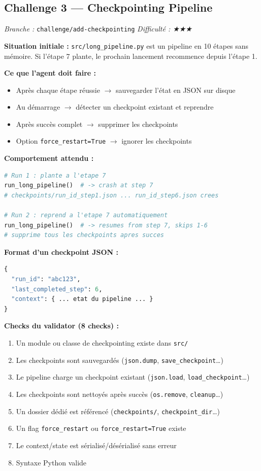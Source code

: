 \documentclass[11pt,a4paper]{article}
\newcommand{\code}[1]{\texttt{#1}}
\begin{document}
\subsection{Challenge 3 — Checkpointing Pipeline}
\textit{Branche :} \code{challenge/add-checkpointing} \quad \textit{Difficulté : ★★★}

\textbf{Situation initiale :}
\code{src/long\_pipeline.py} est un pipeline en 10 étapes sans mémoire.
Si l'étape 7 plante, le prochain lancement recommence depuis l'étape 1.

\textbf{Ce que l'agent doit faire :}
\begin{itemize}
  \item Après chaque étape réussie $\to$ sauvegarder l'état en JSON sur disque
  \item Au démarrage $\to$ détecter un checkpoint existant et reprendre
  \item Après succès complet $\to$ supprimer les checkpoints
  \item Option \code{force\_restart=True} $\to$ ignorer les checkpoints
\end{itemize}

\textbf{Comportement attendu :}
\begin{lstlisting}[language=Python]
# Run 1 : plante a l'etape 7
run_long_pipeline()  # -> crash at step 7
# checkpoints/run_id_step1.json ... run_id_step6.json crees

# Run 2 : reprend a l'etape 7 automatiquement
run_long_pipeline()  # -> resumes from step 7, skips 1-6
# supprime tous les checkpoints apres succes
\end{lstlisting}

\textbf{Format d'un checkpoint JSON :}
\begin{lstlisting}[language=Python]
{
  "run_id": "abc123",
  "last_completed_step": 6,
  "context": { ... etat du pipeline ... }
}
\end{lstlisting}

\textbf{Checks du validator (8 checks) :}
\begin{enumerate}
  \item Un module ou classe de checkpointing existe dans \code{src/}
  \item Les checkpoints sont sauvegardés (\code{json.dump}, \code{save\_checkpoint}\ldots)
  \item Le pipeline charge un checkpoint existant (\code{json.load}, \code{load\_checkpoint}\ldots)
  \item Les checkpoints sont nettoyés après succès (\code{os.remove}, \code{cleanup}\ldots)
  \item Un dossier dédié est référencé (\code{checkpoints/}, \code{checkpoint\_dir}\ldots)
  \item Un flag \code{force\_restart} ou \code{force\_restart=True} existe
  \item Le context/state est sérialisé/désérialisé sans erreur
  \item Syntaxe Python valide
\end{enumerate}
\end{document}
